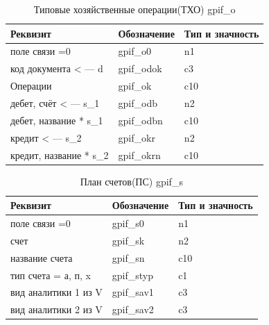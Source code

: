 \begin{table}[h!p]
    \centering
    \scriptsize
    \caption{Типовые хозяйственные операции(ТХО) gpif\_o}
    \begin{tabular}{|l|l|l|} 

                                                                                           \hline
\textbf{Реквизит}                   &\textbf{Обозначение}   &\textbf{Тип и значность}   \\ \hline
поле связи    =0                    &gpif\_o0               &n1                         \\ \hline
код документа        < ---  d       &gpif\_odok             &c3                         \\ \hline
Операции                            &gpif\_ok               &c10                        \\ \hline
дебет, счёт              < --- s\_1 &gpif\_odb              &n2                         \\ \hline
дебет, название        * s\_1       &gpif\_odbn             &c10                        \\ \hline
кредит                    < --- s\_2&gpif\_okr              &n2                         \\ \hline
кредит, название     * s\_2         &gpif\_okrn             &c10                        \\ \hline

    \end{tabular}
\end{table}

\begin{table}[h!p]
    \centering
    \scriptsize
    \caption{План счетов(ПС) gpif\_s}
    \begin{tabular}{|l|l|l|} 

                                                                                   \hline
\textbf{Реквизит}           &\textbf{Обозначение}   &\textbf{Тип и значность}   \\ \hline
поле связи        =0        &gpif\_s0               &n1                         \\ \hline
счет                        &gpif\_sk               &n2                         \\ \hline
название счета              &gpif\_sn               &c10                        \\ \hline
тип счета          = а, п, x&gpif\_styp             &c1                         \\ \hline
вид аналитики 1 из V        &gpif\_sav1             &c3                         \\ \hline
вид аналитики 2 из V        &gpif\_sav2             &c3                         \\ \hline

    \end{tabular}
\end{table}

